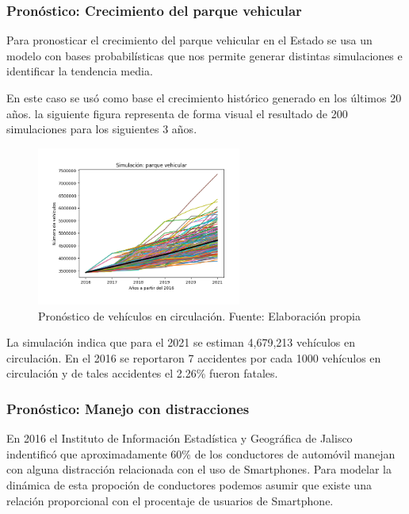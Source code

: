 \documentclass{article}
\begin{document}
\subsubsection{Pronóstico: Crecimiento del parque vehicular}

Para pronosticar el crecimiento del parque vehicular en el Estado se usa
un modelo con bases probabilísticas que nos permite generar distintas
simulaciones e identificar la tendencia media.

En este caso se usó como base el crecimiento histórico generado en los
últimos 20 años. la siguiente figura representa de forma visual el
resultado de 200 simulaciones para los siguientes 3 años.

	\begin{figure}[H]\centering
	\includegraphics[width=0.6\textwidth]{resources/img/vehicle_forecast_img.png}
	\caption{\label{fig:vehicle_forecast} Pronóstico de vehículos en circulación. Fuente: Elaboración propia}
    \end{figure}

La simulación indica que para el 2021 se estiman 4,679,213 vehículos en circulación.
En el 2016 se reportaron 7 accidentes por cada 1000 vehículos en circulación y de tales accidentes el
2.26\% fueron fatales.


\subsubsection{Pronóstico: Manejo con distracciones}

En 2016 el Instituto de Información Estadística y Geográfica de Jalisco indentificó que
aproximadamente 60\% de los conductores de automóvil manejan con alguna distracción
relacionada con el uso de Smartphones. Para modelar la dinámica de esta propoción de conductores podemos
asumir que existe una relación proporcional con el procentaje de usuarios de Smartphone.
\end{document}
